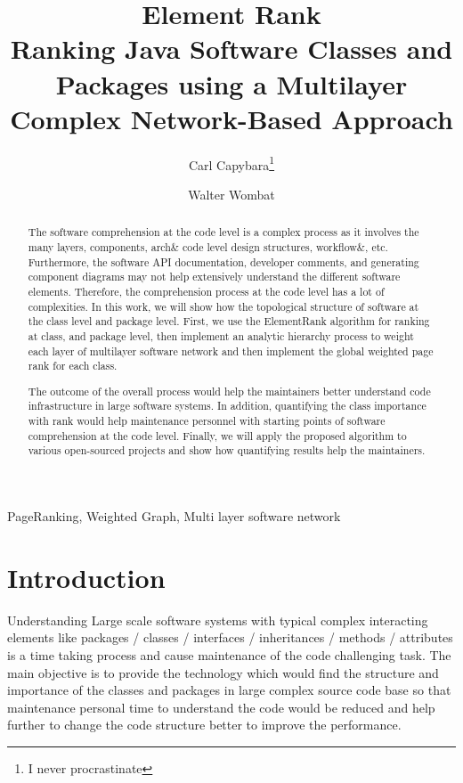 \documentclass{article}
\title {Element Rank \\[0.5ex] \large Ranking Java Software Classes and Packages using a Multilayer Complex Network-Based Approach}
\author{Carl Capybara\thanks{I never procrastinate} \and Walter Wombat}
\begin{document}
%
\maketitle
%
\begin{abstract}
    The software comprehension at the code level is a complex process as it involves the many layers, components, arch& code level design structures, workflow&, etc. Furthermore, the software API documentation, developer comments, and generating component diagrams may not help extensively understand the different software elements. Therefore, the comprehension process at the code level has a lot of complexities. In this work, we will show how the topological structure of software at the class level and package level. First, we use the ElementRank algorithm for ranking at class, and package level, then implement an analytic hierarchy process to weight each layer of multilayer software network and then implement the global weighted page rank for each class.
    
    The outcome of the overall process would help the maintainers better understand code infrastructure in large software systems. In addition, quantifying the class importance with rank would help maintenance personnel with starting points of software comprehension at the code level. Finally, we will apply the proposed algorithm to various open-sourced projects and show how quantifying results help the maintainers. \vspace{2cm}
\end{abstract}
%
\begin{keywords}
PageRanking, Weighted Graph, Multi layer software network
\end{keywords}
%

\newpage

\section{Introduction}
\label{sec:intro}
Understanding Large scale software systems with typical complex interacting elements like packages / classes / interfaces / inheritances / methods / attributes is a time taking process and cause maintenance of the code challenging task. The main objective is to provide the technology which would find the structure and importance of the classes and packages in large complex source code base so that maintenance personal time to understand the code would be reduced and help further to change the code structure better to improve the performance.
\end{document}
